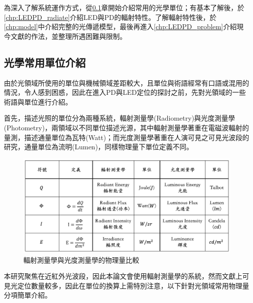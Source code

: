    為深入了解系統運作方式，從\ref{chp:light_unit}章開始介紹常用的光學單位；有基本了解後，於\ref{chp:LEDPD_radiate}介紹LED與PD的輻射特性。了解輻射特性後，於\ref{chp:model}中介紹完整的光傳遞模型，最後再進入\ref{chp:LEDPD_problem}介紹現今文獻的作法，並整理所遇困難與限制。



    \subsection{光學常用單位介紹}
    \label{chp:light_unit}
        
        由於光領域所使用的單位與機械領域差距較大，且單位與術語經常有口語或混用的情況，令人感到困惑，因此在進入PD與LED定位的探討之前，先對光領域的一些術語與單位進行介紹。

        首先，描述光照的單位分為兩種系統，輻射測量學(Radiometry)與光度測量學(Photometry)，兩領域以不同單位描述光源，其中輻射測量學著重在電磁波輻射的量測，描述通量單位為瓦特(Watt)；而光度測量學著重在人演可見之可見光波段的研究，通量單位為流明(Lumen)，同樣物理量下單位定義不同\cite{radiometry_and_photometry}。
        

        \begin{figure}[ht]
            \centering
            \includegraphics[width=14cm]{ch2pic/photometry_table.png}
            \caption{輻射測量學與光度測量學的物理量比較}
            \label{tab:photometry}
        \end{figure}


        本研究聚焦在近紅外光波段，因此本論文會使用輻射測量學的系統，然而文獻上可見光定位數量較多，因此在單位的換算上需特別注意，以下針對光領域常用物理量分項簡單介紹。


